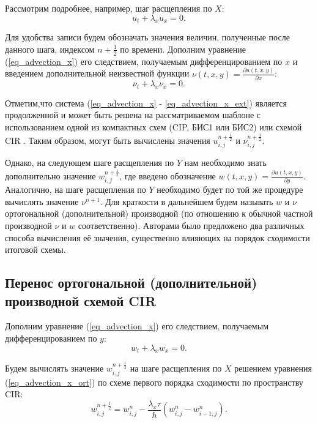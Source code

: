 \documentclass[11pt]{article}
\begin{document}
Рассмотрим подробнее, например, шаг расщепления по $X$:
\begin{equation}
\label{eq_advection_x}
u_t + \lambda_x u_x = 0.
\end{equation}

Для удобства записи будем обозначать значения величин, полученные после данного шага, индексом $n + \frac{1}{2}$ по времени.
Дополним уравнение (\ref{eq_advection_x}) его следствием, получаемым дифференцированием по $x$ и введением дополнительной неизвестной функции $\nu(t, x, y) = \frac{\partial u(t, x, y)}{\partial x}$:
\begin{equation}
\label{eq_advection_x_ext}
\nu_t + \lambda_x \nu_x = 0.
\end{equation}

Отметим,что система (\ref{eq_advection_x} - \ref{eq_advection_x_ext}) является продолженной и может быть решена на рассматриваемом шаблоне с использованием одной из компактных схем (CIP, БИС1 или БИС2) \cite{Khokhlov_NEW} или схемой CIR \cite{Courant1952}.
Таким образом, могут быть вычислены значения $u^{n + \frac{1}{2}}_{i, j}$ и $\nu^{n + \frac{1}{2}}_{i, j}$.

Однако, на следующем шаге расщепления по $Y$ нам необходимо знать дополнительно значение $w^{n + \frac{1}{2}}_{i, j}$, где введено обозначение $w(t, x, y) = \frac{\partial u(t, x, y)}{\partial y}$. Аналогично, на шаге расщепления по $Y$ необходимо будет по той же процедуре вычислять значение $\nu^{n + 1}$.
Для краткости в дальнейшем будем называть $w$ и $\nu$ ортогональной (дополнительной) производной (по отношению к обычной частной производной $\nu$ и $w$ соответственно).
Авторами было предложено два различных способа вычисления её значения, существенно влияющих на порядок сходимости итоговой схемы.

\subsection{Перенос ортогональной (дополнительной) производной схемой CIR}

Дополним уравнение (\ref{eq_advection_x}) его следствием, получаемым дифференцированием по $y$:
\begin{equation}
\label{eq_advection_x_ort}
w_t + \lambda_x w_x = 0.
\end{equation}

Будем вычислять значение $w^{n + \frac{1}{2}}_{i, j}$ на шаге расщепления по $X$ решением уравнения (\ref{eq_advection_x_ort}) по схеме первого порядка сходимости по пространству CIR:
\begin{equation}
\label{eq_advection_x_ort_g}
w^{n + \frac{1}{2}}_{i, j} = w^{n}_{i, j} - \frac{\lambda_x\tau}{h}(w^{n}_{i, j} - w^{n}_{i - 1, j}).
\end{equation}
\end{document}
